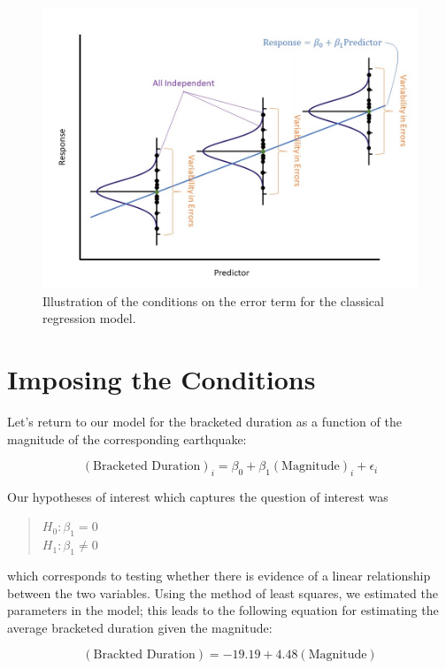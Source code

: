 \documentclass[
]{book}
\theoremstyle{plain}
\theoremstyle{mydefn}
\theoremstyle{myexmpl}
\theoremstyle{remark}
\begin{document}
\begin{figure}

{\centering \includegraphics[width=0.8\linewidth]{./images/RegConditions-Assumptions} 

}

\caption{Illustration of the conditions on the error term for the classical regression model.}\label{fig:regconditions-assumptions}
\end{figure}

\hypertarget{imposing-the-conditions}{%
\section{Imposing the Conditions}\label{imposing-the-conditions}}

Let's return to our model for the bracketed duration as a function of the magnitude of the corresponding earthquake:

\[(\text{Bracketed Duration})_i = \beta_0 + \beta_1(\text{Magnitude})_i + \epsilon_i\]

Our hypotheses of interest which captures the question of interest was

\begin{quote}
\(H_0: \beta_1 = 0\)\\
\(H_1: \beta_1 \neq 0\)
\end{quote}

which corresponds to testing whether there is evidence of a linear relationship between the two variables. Using the method of least squares, we estimated the parameters in the model; this leads to the following equation for estimating the average bracketed duration given the magnitude:

\[(\text{Brackted Duration}) = -19.19 + 4.48(\text{Magnitude})\]
\end{document}
